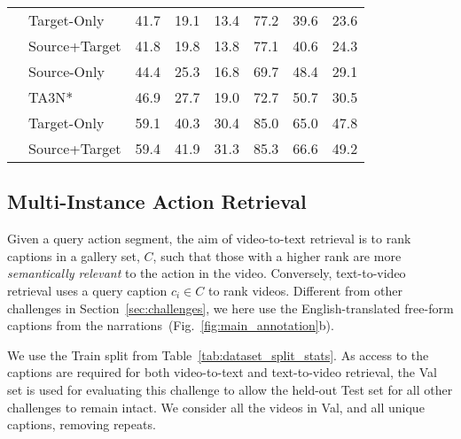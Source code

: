 \documentclass[twocolumn]{svjour3}          \smartqed
\newcommand{\chParagraph}[1]{\noindent {\textbf{#1.}} \hspace{6pt}}
\begin{document}
\begin{table}
\begin{center}
{\begin{tabular}{llrrrrrr}
         & Target-Only &  41.7 &  19.1 &  13.4 &  77.2 &  39.6 &  23.6 \\
          & Source+Target &  41.8 &  19.8 &  13.8 &  77.1 &  40.6 &  24.3 \\
          \midrule
         & Source-Only & 44.4 & 25.3 & 16.8 & 69.7 & 48.4 & 29.1 \\
         & TA3N*~\cite{Chen2019} & 46.9 & 27.7 & 19.0 & 72.7 & 50.7 & 30.5\\
         &  Target-Only &  59.1 &  40.3 &  30.4 &  85.0 &  65.0 &  47.8\\
         &  Source+Target &  59.4 &  41.9 &  31.3 &  85.3 &  66.6 &  49.2\\
    \bottomrule
    \end{tabular}}
    \end{center}
    
\end{table}

\subsection{Multi-Instance Action Retrieval}
\label{sec:action_retrieval_challenge}

\chParagraph{Definition}
\label{subsec:act_retr_definition}
Given a query action segment, the aim of video-to-text retrieval is to rank captions in a gallery set, $C$, such that those with a higher rank are more \emph{semantically relevant} to the action in the video. 
Conversely, text-to-video retrieval uses a query caption $c_i \in C$ to rank videos. 
Different from other challenges in Section~\ref{sec:challenges}, we here use the English-translated free-form captions from the narrations~(Fig.~\ref{fig:main_annotation}b). 

\chParagraph{Splits}We use the Train split from Table~\ref{tab:dataset_split_stats}. As access to the captions are required for both video-to-text and text-to-video retrieval, the Val set is used for evaluating this challenge to allow the held-out Test set for all other challenges to remain intact. We consider all the videos in Val, and all unique captions, removing repeats.
\end{document}
